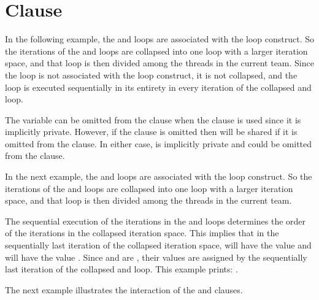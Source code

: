 \pagebreak
\section{ Clause}
\label{sec:collapse}

In the following example, the  and  loops are associated with 
the loop construct. So the iterations of the  and  loops are 
collapsed into one loop with a larger iteration space, and that loop is then divided 
among the threads in the current team. Since the  loop is not associated 
with the loop construct, it is not collapsed, and the  loop is executed 
sequentially in its entirety in every iteration of the collapsed  and 
 loop. 

The variable  can be omitted from the   clause when the 
 clause is used since it is implicitly private. However, if the 
 clause is omitted then  will be shared if it is omitted 
from the  clause. In either case,  is implicitly private 
and could be omitted from the   clause.



In the next example, the  and  loops are associated with the 
loop construct. So the iterations of the  and  loops are collapsed 
into one loop with a larger iteration space, and that loop is then divided among 
the threads in the current team.

The sequential execution of the iterations in the  and  loops 
determines the order of the iterations in the collapsed iteration space. This implies 
that in the sequentially last iteration of the collapsed iteration space,  
will have the value  and  will have the value . Since 
 and  are , their values are assigned 
by the sequentially last iteration of the collapsed  and  loop. 
This example prints: .



The next example illustrates the interaction of the  and  
 clauses.

